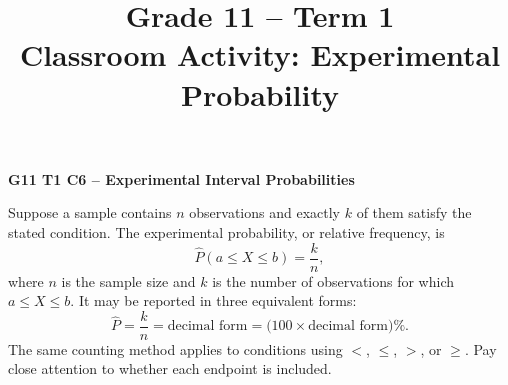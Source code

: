 \makeatletter
{}
\makeatother



\title{Grade 11 -- Term 1 \\ Classroom Activity: Experimental Probability}
\author{}
\date{}

\pagestyle{empty}


\newcommand{\SolutionStage}[2]{%
	\Needspace{6\baselineskip}%
	\subsection{#2}%
}





	\vspace*{-15mm}

	\begin{center}
		{\large\bfseries G11 T1 C6 -- Experimental Interval Probabilities}
	\end{center}

	\vspace{-3mm}

	Suppose a sample contains $n$ observations and exactly $k$ of them
	satisfy the stated condition. The experimental probability, or relative
	frequency, is
	\[
		\boxed{\widehat P(a\leq X\leq b)=\frac{k}{n}},
	\]
	where $n$ is the sample size and $k$ is the number of observations for
	which $a\leq X\leq b$. It may be reported in three equivalent forms:
	\[
		\widehat P=\frac{k}{n}
		=\text{decimal form}
		=\bigl(100\times\text{decimal form}\bigr)\%.
	\]
	The same counting method applies to conditions using $<$, $\leq$, $>$,
	or $\geq$. Pay close attention to whether each endpoint is included.
	

